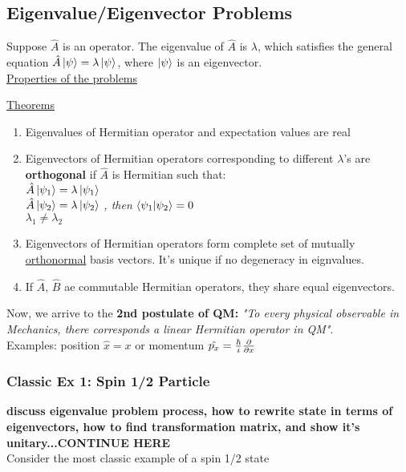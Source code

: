 \documentclass[]{article}
\newcommand{\oneQM}{$1\hspace{-0.21em}\text l$}
\begin{document}
\subsection{Eigenvalue/Eigenvector Problems}
Suppose $\hat{A}$ is an operator. The eigenvalue of $\hat{A}$ is $\lambda$, which satisfies the general equation $\hat{A}\ket{\psi} = \lambda\ket{\psi}$, where $\ket{\psi}$ is an eigenvector.\\
\underline{Properties of the problems}
\underline{Theorems}
\begin{enumerate}
    \item Eigenvalues of Hermitian operator and expectation values are real
    \item Eigenvectors of Hermitian operators corresponding to different $\lambda$'s are \textbf{orthogonal} if $\hat{A}$ is Hermitian such that:\\
    $\hat{A}\ket{\psi_1} = \lambda\ket{\psi_1}$\\
    $\hat{A}\ket{\psi_2} = \lambda\ket{\psi_2}$ \textit{, then }\rightarrow $\braket{\psi_1}{\psi_2} = 0$\\
    $\lambda_1 \ne \lambda_2$
    \item Eigenvectors of Hermitian operators form complete set of mutually \underline{orthonormal} basis vectors. It's unique if no degeneracy in eignvalues.
    \item If $\hat{A}$, $\hat{B}$ ae commutable Hermitian operators, they share equal eigenvectors.
\end{enumerate}
Now, we arrive to the \textbf{2nd postulate of QM:} \textit{"To every physical observable in Mechanics, there corresponds a linear Hermitian operator in QM"}.\\
Examples: position $\hat{x} = x$ or momentum $\hat{p_x} = \frac{\hbar}{i}\partialderivative{x}$


\subsubsection{Classic Ex 1: Spin 1/2 Particle}
\textbf{discuss eigenvalue problem process, how to rewrite state in terms of eigenvectors, how to find transformation matrix, and show it's unitary...CONTINUE HERE}\\
Consider the most classic example of a spin 1/2 state
\end{document}
